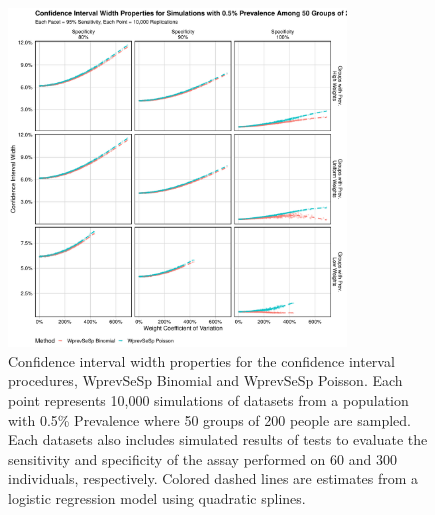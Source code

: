 \documentclass[AMA,STIX1COL]{WileyNJD-v2}
\begin{document}
\begin{figure}
\centering
\includegraphics[width=0.8\textwidth]{figures/imperfect_confidence_interval_width_50_groups_0_005_prev}
\caption{Confidence interval width properties for the confidence interval procedures, WprevSeSp Binomial and WprevSeSp Poisson.
Each point represents 10,000 simulations of datasets from a population with 0.5\% Prevalence where 50 groups of 200 people are sampled.
Each datasets also includes simulated results of tests to evaluate the sensitivity and specificity of the assay performed on 60 and 300 individuals, respectively.
Colored dashed lines are estimates from a logistic regression model using quadratic splines.}
\label{fig:imperfect_confidence_interval_width_50_groups_0_005_prev}
\end{figure}
\end{document}
